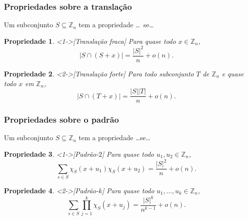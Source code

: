 \documentclass{beamer}
\def\MMZ{\mathbb{Z}} %
\def\MMp{\mathrm{.}} %
\theoremstyle{teoaxicorlem}
\newtheorem{Propr}{Propriedade}
\theoremstyle{defnotnom}
\begin{document}
\begin{frame}
  \frametitle{Propriedades sobre a translação}
  Um subconjunto $S\subseteq\MMZ_n$ tem a propriedade \dots\ se\dots
  \begin{Propr}<1->[Translação fraca]
    Para quase todo $x\in\MMZ_n$,
    \begin{equation*}
      \bigl|S\cap (S+x)\bigr| = \frac{|S|^2}{n} + o(n)\MMp
    \end{equation*}
  \end{Propr}
  \vfill
  \begin{Propr}<2->[Translação forte]
    Para todo subconjunto $T$ de $\MMZ_n$ e quase todo $x$ em $\MMZ_n$,
    \begin{equation*}
      \bigl|S\cap (T+x)\bigr| = \frac{|S||T|}{n} + o(n)\MMp
    \end{equation*}
  \end{Propr}
\end{frame}

\begin{frame}
  \frametitle{Propriedades sobre o padrão}
  Um subconjunto $S\subseteq\MMZ_n$ tem a propriedade \dots se\dots
  \begin{Propr}<1->[Padrão-$2$]
    Para quase todo $u_1,u_2\in\MMZ_n$,
    \begin{equation*}
      \sum_{s\in S}\chi_S(x+u_1)\chi_S(x+u_2) =
      \frac{|S|^2}{n} + o(n)\MMp
    \end{equation*}
  \end{Propr}
  \vfill
  \begin{Propr}<2->[Padrão-$k$]
    Para quase todo $u_1,\dotsc,u_k\in\MMZ_n$,
    \begin{equation*}
      \sum_{s\in S}\prod_{j=1}^k\chi_S(x+u_j) =
      \frac{|S|^k}{n^{k-1}} + o(n)\MMp
    \end{equation*}
  \end{Propr}
\end{frame}
\end{document}
